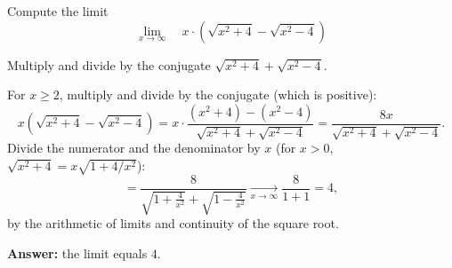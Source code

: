 
\begin{question}
Compute the limit
\[ \lim_{x\to\infty}\quad x\cdot\left(\sqrt{x^2 + 4} - \sqrt{x^2 - 4}\right) \]
\end{question}

\begin{hint}
Multiply and divide by the conjugate $\sqrt{x^2+4} + \sqrt{x^2-4}$.
\end{hint}

\begin{solution}
For $x \ge 2$, multiply and divide by the conjugate (which is positive):
\[ x\left(\sqrt{x^2+4} - \sqrt{x^2-4}\right) = x\cdot\frac{(x^2 + 4) - (x^2 - 4)}{\sqrt{x^2+4} + \sqrt{x^2-4}} = \frac{8x}{\sqrt{x^2+4} + \sqrt{x^2-4}}. \]
Divide the numerator and the denominator by $x$ (for $x>0$, $\sqrt{x^2 + 4} = x\sqrt{1 + 4/x^2}$):
\[ = \frac{8}{\sqrt{1 + \frac4{x^2}} + \sqrt{1 - \frac4{x^2}}} \xrightarrow[x\to\infty]{} \frac{8}{1 + 1} = 4, \]
by the arithmetic of limits and continuity of the square root.

\textbf{Answer:} the limit equals $4$.
\end{solution}
